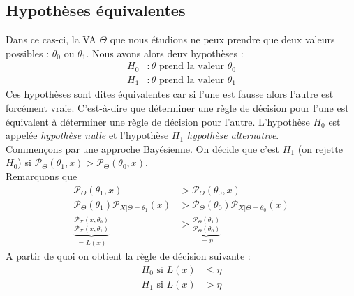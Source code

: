 \documentclass[a4paper,12pt]{report}
\theoremstyle{definition}
\renewcommand{\(}{\left(}
\renewcommand{\)}{\right)}
\renewcommand{\P}{\mathcal{P}}
\renewcommand{\t}{\text}
\renewcommand{\d}{\textit}
\begin{document}
        \subsection{Hypothèses équivalentes}
        
            Dans ce cas-ci, la VA $\Theta$ que nous étudions ne peux prendre que deux valeurs possibles : $\theta_0$ ou $\theta_1$. Nous avons alors deux hypothèses : 
            \begin{align*}
                H_0 &: \theta \t{ prend la valeur } \theta_0 \\
                H_1 &: \theta \t{ prend la valeur } \theta_1
            \end{align*}
            Ces hypothèses sont dites équivalentes car si l'une est fausse alors l'autre est forcément vraie. C'est-à-dire que déterminer une règle de décision pour l'une est équivalent à déterminer une règle de décision pour l'autre. L'hypothèse $H_0$ est appelée \d{hypothèse nulle} et l'hypothèse $H_1$ \d{hypothèse alternative}.\\
            
            Commençons par une approche Bayésienne. On décide que c'est $H_1$ (on rejette $H_0$) si $\P_\Theta(\theta_1,x)>\P_\Theta(\theta_0,x)$. \\
            Remarquons que
            \begin{align*}
                \P_\Theta(\theta_1,x) &> \P_\Theta(\theta_0,x) \\
                \P_\Theta(\theta_1)\P_{X|\Theta=\theta_1}(x) &> \P_\Theta(\theta_0)\P_{X|\Theta=\theta_0}(x) \\
                \underbrace{\frac{\P_X(x,\theta_0)}{\P_X(x,\theta_1)}}_{=L(x)} &> \underbrace{\frac{\P_\Theta(\theta_1)}{\P_\Theta(\theta_0)}}_{=\eta}
            \end{align*}
            A partir de quoi on obtient la règle de décision suivante :
            \begin{align*}
                H_0 \t{ si } L(x) &\leq \eta \\
                H_1 \t{ si } L(x) &> \eta
            \end{align*}
            
\end{document}
